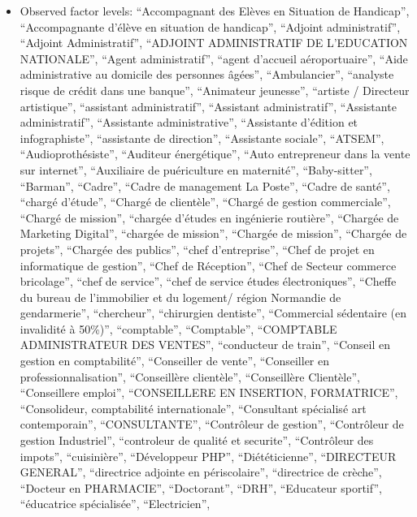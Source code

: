\documentclass[
  letterpaper,
  DIV=11,
  numbers=noendperiod]{scrartcl}
\providecommand{\tightlist}{%
  \setlength{\itemsep}{0pt}\setlength{\parskip}{0pt}}
\begin{document}
\emini

\begin{itemize}
\tightlist
\item
  Observed factor levels: ``Accompagnant des Elèves en Situation de
  Handicap'', ``Accompagnante d'élève en situation de handicap'',
  ``Adjoint administratif'', ``Adjoint Administratif'', ``ADJOINT
  ADMINISTRATIF DE L'EDUCATION NATIONALE'', ``Agent administratif'',
  ``agent d'accueil aéroportuaire'', ``Aide administrative au domicile
  des personnes âgées'', ``Ambulancier'', ``analyste risque de crédit
  dans une banque'', ``Animateur jeunesse'', ``artiste / Directeur
  artistique'', ``assistant administratif'', ``Assistant
  administratif'', ``Assistante administratif'', ``Assistante
  administrative'', ``Assistante d'édition et infographiste'',
  ``assistante de direction'', ``Assistante sociale'', ``ATSEM'',
  ``Audioprothésiste'', ``Auditeur énergétique'', ``Auto entrepreneur
  dans la vente sur internet'', ``Auxiliaire de puériculture en
  maternité'', ``Baby-sitter'', ``Barman'', ``Cadre'', ``Cadre de
  management La Poste'', ``Cadre de santé'', ``chargé d'étude'',
  ``Chargé de clientèle'', ``Chargé de gestion commerciale'', ``Chargé
  de mission'', ``chargée d'études en ingénierie routière'', ``Chargée
  de Marketing Digital'', ``chargée de mission'', ``Chargée de
  mission'', ``Chargée de projets'', ``Chargée des publics'', ``chef
  d'entreprise'', ``Chef de projet en informatique de gestion'', ``Chef
  de Réception'', ``Chef de Secteur commerce bricolage'', ``chef de
  service'', ``chef de service études électroniques'', ``Cheffe du
  bureau de l'immobilier et du logement/ région Normandie de
  gendarmerie'', ``chercheur'', ``chirurgien dentiste'', ``Commercial
  sédentaire (en invalidité à 50\%)'', ``comptable'', ``Comptable'',
  ``COMPTABLE ADMINISTRATEUR DES VENTES'', ``conducteur de train'',
  ``Conseil en gestion en comptabilité'', ``Conseiller de vente'',
  ``Conseiller en professionnalisation'', ``Conseillère clientèle'',
  ``Conseillère Clientèle'', ``Conseillere emploi'', ``CONSEILLERE EN
  INSERTION, FORMATRICE'', ``Consolideur, comptabilité internationale'',
  ``Consultant spécialisé art contemporain'', ``CONSULTANTE'',
  ``Contrôleur de gestion'', ``Contrôleur de gestion Industriel'',
  ``controleur de qualité et securite'', ``Contrôleur des impots'',
  ``cuisinière'', ``Développeur PHP'', ``Diététicienne'', ``DIRECTEUR
  GENERAL'', ``directrice adjointe en périscolaire'', ``directrice de
  crèche'', ``Docteur en PHARMACIE'', ``Doctorant'', ``DRH'',
  ``Educateur sportif'', ``éducatrice spécialisée'', ``Electricien'',

\end{itemize}
\end{document}
